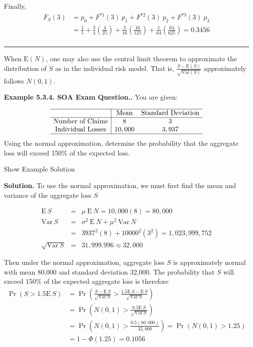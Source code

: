 \documentclass[]{book}
\theoremstyle{definition}
\theoremstyle{definition}
\theoremstyle{definition}
\theoremstyle{remark}
\begin{document}
Finally, \[\begin{aligned}
F_{S}(3) &= p_0 + F^{\ast 1}(3) \ p_1 + F^{\ast 2}(3) \ p_2 + F^{\ast 3}(3) \ p_3 \\
&= \frac{1}{5} + \frac{3}{4}\left(\frac{4}{25} \right) + \frac{3}{16} \left( \frac{16}{125} \right) + \frac{1}{64} \left( \frac{64}{625}\right) = 0.3456\\
\end{aligned}\]

\begin{center}\rule{0.5\linewidth}{\linethickness}\end{center}

When \(\mathrm{E}(N)\), one may also use the central limit theorem to
approximate the distribution of \(S\) as in the individual risk model.
That is, \(\frac{S - \mathrm{E}(S)}{\sqrt{\mathrm{Var}(S)}}\)
approximately follows \(N(0,1)\).

\textbf{Example 5.3.4. SOA Exam Question..} You are given:

\[\begin{matrix}
  \begin{array}{ c | c  c }
    \hline
      & \text{Mean} & \text{Standard Deviation}\\ \hline
    \text{Number of Claims} & 8 & 3\\
    \text{Individual Losses} & 10,000 & 3,937\\
    \hline
  \end{array}
\end{matrix}\] Using the normal approximation, determine the probability
that the aggregate loss will exceed 150\(\%\) of the expected loss.

Show Example Solution

\hypertarget{toggleExampleAggLoss.3.4}{}
\textbf{Solution.} To use the normal approximation, we must first find
the mean and variance of the aggregate loss \(S\)

\begin{eqnarray*}
\mathrm{E~}S &=& \mu \ \mathrm{E~}N = 10,000(8) = 80,000\\
\mathrm{Var~}S &=& \sigma^2 \ \mathrm{E~}N + \mu^2 \ \mathrm{Var~}N\\
&=& 3937^2(8) + 10000^2 (3^2) = 1,023,999,752\\
\sqrt{\mathrm{Var~}S} &=& 31,999.996 \approx 32,000
\end{eqnarray*}

Then under the normal approximation, aggregate loss \(S\) is
approximately normal with mean 80,000 and standard deviation 32,000. The
probability that \(S\) will exceed 150\(\%\) of the expected aggregate
loss is therefore \[\begin{aligned}
\Pr(S>1.5 \mathrm{E~}S) &= \Pr \left( \frac{S - \mathrm{E~} S}{\sqrt{\mathrm{Var~}S}} > \frac{1.5 \mathrm{E~}S - \mathrm{E~} S}{\sqrt{\mathrm{Var~}S}} \right) \\
&= \Pr \left( N(0,1) > \frac{0.5 \mathrm{E~}S}{\sqrt{\mathrm{Var~}S} } \right) \\
&= \Pr \left( N(0,1) > \frac{0.5(80,000)}{32,000} \right) = \Pr( N(0,1) > 1.25) \\
&= 1-\Phi(1.25) = 0.1056
\end{aligned}\]
\end{document}

